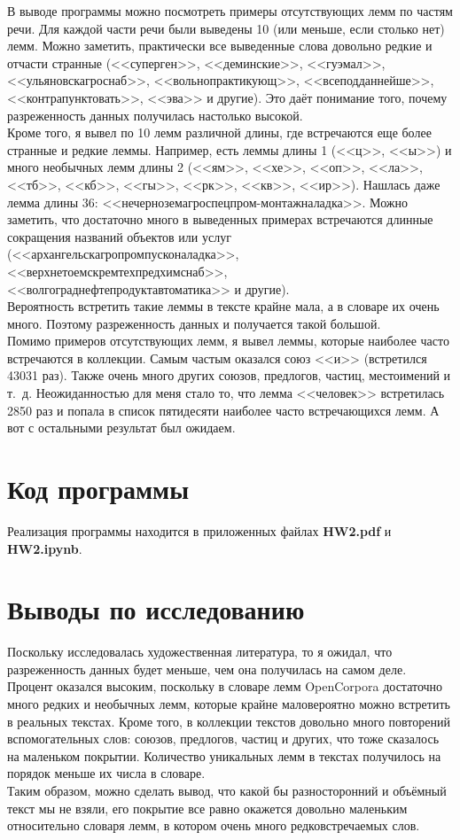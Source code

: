 \documentclass[oneside,final,12pt]{article}
\begin{document}
В выводе программы можно посмотреть примеры отсутствующих лемм по частям речи. Для каждой части речи были выведены 10 (или меньше, если столько нет) лемм. Можно заметить, практически все выведенные слова довольно редкие и отчасти странные (<<суперген>>, <<деминские>>, <<гуэмал>>, <<ульяновскагроснаб>>, <<вольнопрактикующ>>, <<всеподданнейше>>, <<контрапунктовать>>, <<эва>> и другие). Это даёт понимание того, почему разреженность данных получилась настолько высокой.\\

Кроме того, я вывел по 10 лемм различной длины, где встречаются еще более странные и редкие леммы. Например, есть леммы длины 1 (<<ц>>, <<ы>>) и много необычных лемм длины 2 (<<ям>>, <<хе>>, <<оп>>, <<ла>>, <<тб>>, <<кб>>, <<гы>>, <<рк>>, <<кв>>, <<ир>>). Нашлась даже лемма длины 36: <<нечерноземагроспецпром-монтажналадка>>. Можно заметить, что достаточно много в выведенных примерах встречаются длинные сокращения названий объектов или услуг (<<архангельскагропромпусконаладка>>, <<верхнетоемскремтехпредхимснаб>>, <<волгограднефтепродуктавтоматика>> и другие).\\

Вероятность встретить такие леммы в тексте крайне мала, а в словаре их очень много. Поэтому разреженность данных и получается такой большой.\\

Помимо примеров отсутствующих лемм, я вывел леммы, которые наиболее часто встречаются в коллекции. Самым частым оказался союз <<и>> (встретился 43031 раз). Также очень много других союзов, предлогов, частиц, местоимений и т.~д. Неожиданностью для меня стало то, что лемма <<человек>> встретилась 2850 раз и попала в список пятидесяти наиболее часто встречающихся лемм. А вот с остальными результат был ожидаем.

\section{Код программы}

Реализация программы находится в приложенных файлах \textbf{HW2.pdf} и \textbf{HW2.ipynb}.

\newpage


\section{Выводы по исследованию}

Поскольку исследовалась художественная литература, то я ожидал, что разреженность данных будет меньше, чем она получилась на самом деле. Процент оказался высоким, поскольку в словаре лемм OpenCorpora достаточно много редких и необычных лемм, которые крайне маловероятно можно встретить в реальных текстах. Кроме того, в коллекции текстов довольно много повторений вспомогательных слов: союзов, предлогов, частиц и других, что тоже сказалось на маленьком покрытии. Количество уникальных лемм в текстах получилось на порядок меньше их числа в словаре.\\

Таким образом, можно сделать вывод, что какой бы разносторонний и объёмный текст мы не взяли, его покрытие все равно окажется довольно маленьким относительно словаря лемм, в котором очень много редковстречаемых слов.
\end{document}
